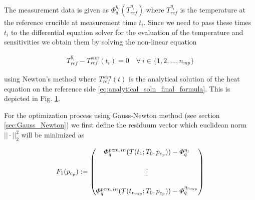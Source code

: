 \documentclass{scrartcl}[12pt, halfparskip]
\numberwithin{equation}{section}
\numberwithin{figure}{section}
\numberwithin{table}{section}
\begin{document}
The measurement data is given as $\varPhi_q^{\eta_i}(T_{ref}^{\eta_i})$ where $T_{ref}^{\eta_i}$ is the temperature at the reference crucible at measurement time $t_i$. Since we need to pass these times $t_i$ to the differential equation solver for the evaluation of the temperature and sensitivities we obtain them by solving the non-linear equation 

\begin{align}
	T_{ref}^{\eta_i} - T_{ref}^{sim}(t_i) = 0 \quad \forall \ i \in \{1,2,...,n_{mp}\}
\end{align}

using Newton's method where $T_{ref}^{sim}(t)$ is the analytical solution of the heat equation on the reference side \eqref{eq:analytical_soln_final_formula}. This is depicted in Fig. \ref{fig:obtaining_measurement_times}.


\begin{figure}[H]
	\centering
	\caption{}
	\label{fig:obtaining_measurement_times}
\end{figure}


\begin{flushright}
	
\end{flushright}
For the optimization process using Gauss-Newton method (see section \ref{sec:Gauss_Newton}) we first define the residuum vector which euclidean norm $|| \cdot ||_2^2$ will be minimized as 

\begin{equation}
	F_1(p_{c_p}) :=
	\begin{pmatrix}
		\varPhi_{q}^{pcm,in}(T(t_1;T_0,p_{c_p})) - \varPhi_q^{\eta_1} \\
		\textcolor{white}{} \\
		\vdots \\
		\textcolor{white}{} \\
		\varPhi_{q}^{pcm,in}(T(t_{n_{mp}};T_0,p_{c_p})) - \varPhi_q^{\eta_{n_{mp}}}
	\end{pmatrix}
\end{equation} \\
\end{document}
